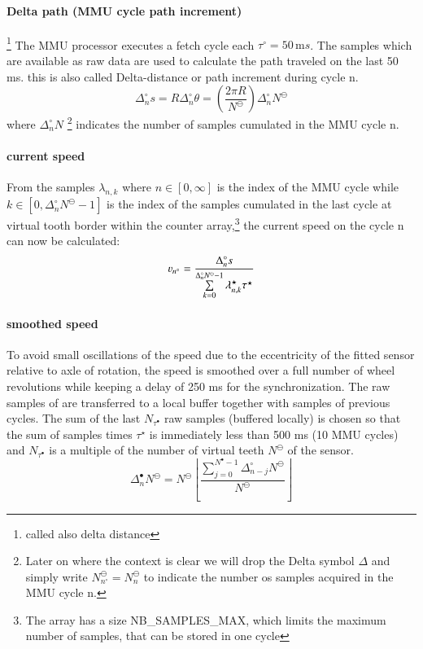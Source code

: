 \paragraph{Delta path (\gls{MMU} cycle path increment)}\footnote {called also delta distance}
The \gls{MMU} processor executes a fetch cycle each $\tau^\circ=50\, \mathrm{m}s$. The samples which are available as raw data are used to calculate the path traveled on the last 50 ms. this is also called Delta-distance or path increment during cycle n.
\begin{equation}
\Delta^\circ_n s = R \Delta^\circ_n \theta = \left(\frac{2\pi R}{N^\ominus} \right) \Delta^\circ_n N^\ominus
\end{equation}
where $\Delta^\circ_n N $ \footnote{Later on where the context is clear we will drop the Delta symbol $\Delta$ and simply write $N^\ominus_{n^\circ}=N^\ominus_{n}$ to indicate the number os samples acquired in the \gls{MMU} cycle n.}  indicates the number of samples cumulated in the \gls{MMU} cycle n. 
\paragraph{current speed}
From the samples $\lambda_{n,k}$ where $n\in[0,\infty] $ is  the index of the \gls{MMU} cycle while $k\in[0,\Delta^\circ_n N^\ominus-1]$ is the index of the samples cumulated in the last cycle at virtual tooth border within the counter array,\footnote{The array has a size NB\_SAMPLES\_MAX, which limits the maximum number of samples, that can be stored in one cycle} the current speed on the cycle n can now be calculated:
\begin{equation}
\varv_{n^\circ} =\frac{\Delta^\circ _n s}{\sum\limits_{k=0}^{\Delta^\circ_n N^\ominus-1}\lambda^\star_{n,k}\tau^\star}  
\end{equation}
\paragraph{smoothed speed}
To avoid small oscillations of the speed due to the eccentricity of the fitted sensor relative to axle of rotation, the speed is smoothed over a full number of wheel revolutions while keeping a delay of 250 ms for the synchronization.
The raw samples of are transferred to a local buffer together with samples of previous cycles.
The sum of the last $N_{\tau^\bullet}$ raw samples (buffered locally) is chosen so that the sum of samples times $\tau^\star$ is immediately less than 500 ms (10 \gls{MMU} cycles) and $N_{\tau^\bullet}$ is a multiple of the number of virtual teeth $N^\ominus$ of the sensor.
\begin{equation}
\Delta^{\bullet}_n N^\ominus=N^\ominus \left\lfloor \frac {\sum\limits_{j=0}^{N^\bullet-1} \Delta^\circ_{n-j}{N^\ominus} }{N^\ominus}\right\rfloor 
\end{equation} 

